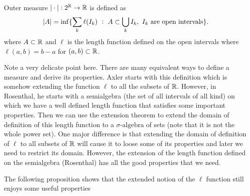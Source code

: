 \begin{definition}
	\label{def:extensionOfOuterMeasureToWholeR}
	Outer measure $ |\cdot|: 2^{\mathbb{R}} \to \mathbb{R} $ is defined as
	\[ |A| = \inf\{\sum_{k}\ell(I_k)\ :\ A \subset \bigcup_k I_k,\ I_k\text{ are open intervals}\}. \]
	where $ A \subset \mathbb{R} $ and $ \ell $ is the length function defined on the open intervals where $ \ell(a,b) = b-a $ for $ (a,b)\subset \mathbb{R} $.
\end{definition}
\begin{remark}
	Note a very delicate point here. There are many equivalent ways to define a measure and derive its properties. Axler starts with this definition which is somehow extending the function $ \ell $ to all the subsets of $ \mathbb{R} $. However, in Rosenthal, he starts with a semialgebra (the set of all intervals of all kind) on which we have a well defined length function that satisfies some important properties. Then we can use the extension theorem to extend the domain of definition of this length function to a $ \sigma\text{-algebra} $ of sets (note that it is not the whole power set). One major difference is that extending the domain of definition of $ \ell $ to all subsets of $ \mathbb{R} $ will cause it to loose some of its properties and later we need to restrict its domain. However, the extension of the length function defined on the semialgebra (Rosenthal) has all the good properties that we need.
\end{remark}


The following proposition shows that the extended notion of the $ \ell $ function still enjoys some useful properties

